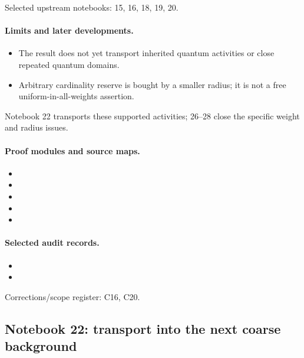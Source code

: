 \documentclass[11pt]{article}
\theoremstyle{remark}
\begin{document}
Selected upstream notebooks: 15, 16, 18, 19, 20.\par

\paragraph{Limits and later developments.}
\begin{itemize}
\item The result does not yet transport inherited quantum activities or close repeated quantum domains.
\item Arbitrary cardinality reserve is bought by a smaller radius; it is not a free uniform-in-all-weights assertion.
\end{itemize}

Notebook 22 transports these supported activities; 26--28 close the specific weight and radius issues.

\paragraph{Proof modules and source maps.}
\begingroup\small
\begin{itemize}
\item {}
\item {}
\item {}
\item {}
\item {}
\end{itemize}
\endgroup

\paragraph{Selected audit records.}
\begingroup\small
\begin{itemize}
\item {}
\item {}
\end{itemize}
\endgroup
Corrections/scope register: C16, C20.\par

\subsection{Notebook 22: transport into the next coarse background}
\label{hnc-22}
\noindent{}\par
\end{document}

